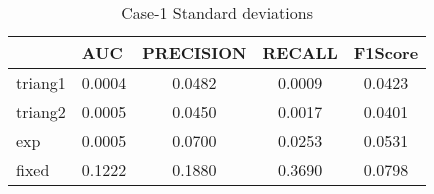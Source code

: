 \begin{table}[htbp]
  \centering
  \caption{Case-1 Standard deviations}
    \begin{tabular}{|p{2.89em}|c|c|c|c|}
    \toprule
    \rowcolor[rgb]{ .718,  .871,  .91} \multicolumn{1}{|l|}{Policy} & \multicolumn{1}{l|}{AUC} & \multicolumn{1}{l|}{PRECISION} & \multicolumn{1}{l|}{RECALL} & \multicolumn{1}{l|}{F1Score} \\
    \midrule
    \rowcolor[rgb]{ .847,  .894,  .737} triang1 & 0.0004 & 0.0482 & 0.0009 & 0.0423 \\
    \midrule
    \rowcolor[rgb]{ .847,  .894,  .737} triang2 & 0.0005 & 0.0450 & 0.0017 & 0.0401 \\
    \midrule
    \rowcolor[rgb]{ .847,  .894,  .737} exp   & 0.0005 & 0.0700 & 0.0253 & 0.0531 \\
    \midrule
    \rowcolor[rgb]{ .847,  .894,  .737} fixed & 0.1222 & 0.1880 & 0.3690 & 0.0798 \\
    \bottomrule
    \end{tabular}%
  \label{tab:sk17std}%
\end{table}%
